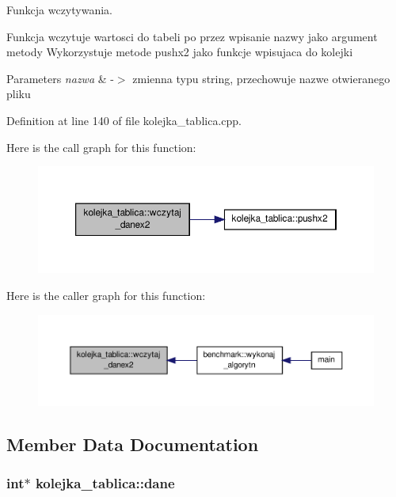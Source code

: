 Funkcja wczytywania. 

Funkcja wczytuje wartosci do tabeli po przez wpisanie nazwy jako argument metody Wykorzystuje metode pushx2 jako funkcje wpisujaca do kolejki


\begin{DoxyParams}{Parameters}
{\em nazwa} & -\/$>$ zmienna typu string, przechowuje nazwe otwieranego pliku \\
\hline
\end{DoxyParams}


Definition at line 140 of file kolejka\-\_\-tablica.\-cpp.



Here is the call graph for this function\-:\nopagebreak
\begin{figure}[H]
\begin{center}
\leavevmode
\includegraphics[width=350pt]{classkolejka__tablica_a997d0fa8aa2ff8eb838998a82353d828_cgraph}
\end{center}
\end{figure}




Here is the caller graph for this function\-:\nopagebreak
\begin{figure}[H]
\begin{center}
\leavevmode
\includegraphics[width=350pt]{classkolejka__tablica_a997d0fa8aa2ff8eb838998a82353d828_icgraph}
\end{center}
\end{figure}




\subsection{Member Data Documentation}
\hypertarget{classkolejka__tablica_a3db25a7939b4a9d96127b29b753d9010}{
\subsubsection[{dane}]{\setlength{\rightskip}{0pt plus 5cm}int$\ast$ kolejka\-\_\-tablica\-::dane\hspace{0.3cm}{\ttfamily [private]}}}\label{classkolejka__tablica_a3db25a7939b4a9d96127b29b753d9010}


